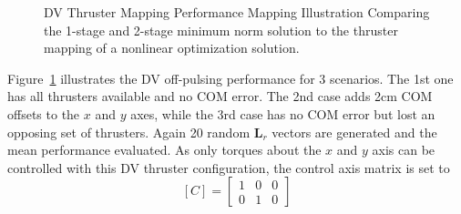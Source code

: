 \begin{figure}[t]
	\centering
	\caption{DV Thruster Mapping Performance Mapping Illustration Comparing the 1-stage and 2-stage minimum norm solution to the thruster mapping of a nonlinear optimization solution.}
	\label{fig:minTorqueDV}
\end{figure}

Figure~\ref{fig:minTorqueDV} illustrates the DV off-pulsing performance for 3 scenarios.  The 1st one has all thrusters available and no COM error.  The 2nd case adds 2cm COM offsets to the $x$ and $y$ axes, while the 3rd case has no COM error but lost an opposing set of thrusters.  Again 20 random $\bm L_{r}$ vectors are generated and the mean performance evaluated.  As only torques about the $x$ and $y$ axis can be controlled with this DV thruster configuration, the control axis matrix is set to 
$$
	[C] = \begin{bmatrix}
		1 & 0 & 0 \\
		0 & 1 & 0
	\end{bmatrix}
$$

